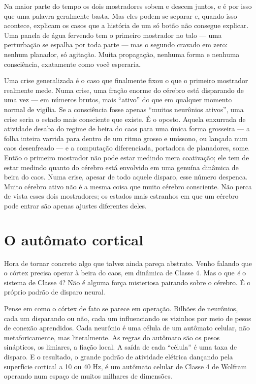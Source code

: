 \documentclass[11pt, twoside, openright]{book}
\begin{document}
Na maior parte do tempo os dois mostradores sobem e descem juntos, e é por isso que uma palavra geralmente basta. Mas eles podem se separar e, quando isso acontece, explicam os casos que a história de um só botão não consegue explicar. Uma panela de água fervendo tem o primeiro mostrador no talo --- uma perturbação se espalha por toda parte --- mas o segundo cravado em zero: nenhum planador, só agitação. Muita propagação, nenhuma forma e nenhuma consciência, exatamente como você esperaria.

Uma crise generalizada é o caso que finalmente fixou o que o primeiro mostrador realmente mede. Numa crise, uma fração enorme do cérebro está disparando de uma vez --- em números brutos, mais ``ativo'' do que em qualquer momento normal de vigília. Se a consciência fosse apenas ``muitos neurônios ativos'', uma crise seria o estado mais consciente que existe. É o oposto. Aquela enxurrada de atividade desaba do regime de beira do caos para uma única forma grosseira --- a folha inteira varrida para dentro de um ritmo grosso e uníssono, ou lançada num caos desenfreado --- e a computação diferenciada, portadora de planadores, some. Então o primeiro mostrador não pode estar medindo mera coativação; ele tem de estar medindo quanto do cérebro está envolvido em uma genuína dinâmica de beira do caos. Numa crise, apesar de todo aquele disparo, esse número despenca. Muito cérebro ativo não é a mesma coisa que muito cérebro consciente. Não perca de vista esses dois mostradores; os estados mais estranhos em que um cérebro pode entrar são apenas ajustes diferentes deles.

\section*{O autômato cortical}

Hora de tornar concreto algo que talvez ainda pareça abstrato. Venho falando que o córtex precisa operar à beira do caos, em dinâmica de Classe 4. Mas o que \textit{é} o sistema de Classe 4? Não é alguma força misteriosa pairando sobre o cérebro. É o próprio padrão de disparo neural.

Pense em como o córtex de fato se parece em operação. Bilhões de neurônios, cada um disparando ou não, cada um influenciando os vizinhos por meio de pesos de conexão aprendidos. Cada neurônio é uma célula de um autômato celular, não metaforicamente, mas literalmente. As regras do autômato são os pesos sinápticos, os limiares, a fiação local. A saída de cada ``célula'' é uma taxa de disparo. E o resultado, o grande padrão de atividade elétrica dançando pela superfície cortical a 10 ou 40 Hz, é um autômato celular de Classe 4 de Wolfram operando num espaço de muitos milhares de dimensões.
\end{document}
